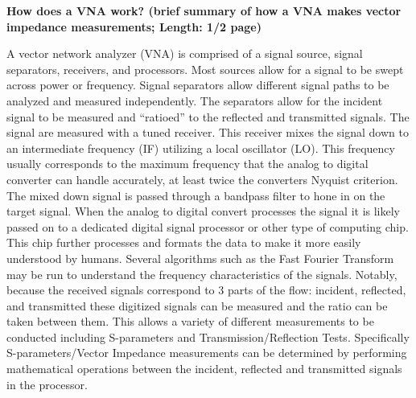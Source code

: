 \documentclass[journal]{IEEEtran}
\begin{document}
\textbf{How does a VNA work? (brief summary of how a VNA makes vector impedance measurements; Length: 1/2 page)}

A vector network analyzer (VNA) is comprised of a signal source, signal
separators, receivers, and processors. Most sources allow for a signal to be
swept across power or frequency. Signal separators allow different signal paths
to be analyzed and measured independently. The separators allow for the incident
signal to be measured and ``ratioed'' to the reflected and transmitted signals.
The signal are measured with a tuned receiver. This receiver mixes the signal
down to an intermediate frequency (IF) utilizing a local oscillator (LO). This
frequency usually  corresponds to the maximum frequency that the analog to
digital converter can handle accurately, at least twice the converters Nyquist
criterion.  The mixed down signal is passed through a bandpass filter to hone in
on the target signal. When the analog to digital convert processes the signal it
is likely passed on to a dedicated digital signal processor or other type of
computing chip. This chip further processes and formats the data to make it more
easily understood by humans. Several algorithms such as the Fast Fourier
Transform may be run to understand the frequency characteristics of the
signals. Notably, because the received signals correspond to 3 parts of the
flow: incident, reflected, and transmitted these digitized signals can be
measured and the ratio can be taken between them. This allows a variety of different
measurements to be conducted including S-parameters and Transmission/Reflection
Tests. Specifically S-parameters/Vector Impedance measurements can be
determined by performing mathematical operations between the incident, reflected
and transmitted signals in the processor.

\end{document}
